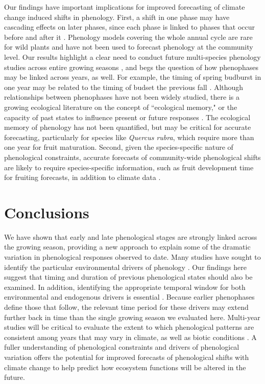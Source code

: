 \documentclass{article}
\begin{document}
\par Our findings have important implications for improved forecasting of climate change induced shifts in phenology. First, a shift in one phase may have cascading effects on later phases, since each phase is linked to phases that occur before and after it \citep{wolkovich2014b}. Phenology models covering the whole annual cycle are rare for wild plants \citep[but see][]{chuine2001} and have not been used to forecast phenology at the community level. Our results highlight a clear need to conduct future multi-species phenology studies across entire growing seasons \citep{wolkovich2014}, and begs the question of how phenophases may be linked across years, as well. For example, the timing of spring budburst in one year may be related to the timing of budset the previous fall \citep {mimura2010}. Although relationships between phenophases have not been widely studied, there is a growing ecological literature on the concept of ``ecological memory," or the capacity of past states to influence present or future responses \citep {ogle2015}. The ecological memory of phenology has not been quantified, but may be critical for accurate forecasting, particularly for species like \emph{Quercus rubra}, which require more than one year for fruit maturation. Second, given the species-specific nature of phenological constraints, accurate forecasts of community-wide phenological shifts are likely to require species-specific information, such as fruit development time for fruiting forecasts, in addition to climate data \citep{diez2012}.

\section* {Conclusions}
We have shown that early and late phenological stages are strongly linked across the growing season, providing a new approach to explain some of the dramatic variation in phenological responses observed to date. Many studies have sought to identify the particular environmental drivers of phenology \citep [e.g.,][]{morin2010,schwartz2013}. Our findings here suggest that timing and duration of previous phenological states should also be examined. In addition, identifying the appropriate temporal window for both environmental and endogenous drivers is essential \citep{teller2016}. Because earlier phenophases define those that follow, the relevant time period for these drivers may extend further back in time than the single growing season we evaluated here. Multi-year studies will be critical to evaluate the extent to which phenological patterns are consistent among years that may vary in climate, as well as biotic conditions \citep [i.e., pollinator or pest populations,][]{lechowicz1995}. %
A fuller understanding of phenological constraints and drivers of phenological variation offers the potential for improved forecasts of phenological shifts with climate change to help predict how ecosystem functions will be altered in the future. 
\end{document}
